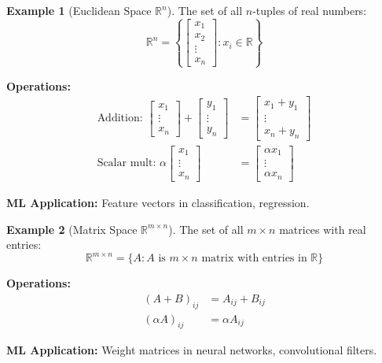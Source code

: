 \documentclass[12pt,a4paper]{article}
\theoremstyle{definition}
\newtheorem{example}{Example}[section]
\begin{document}
\begin{example}[Euclidean Space $\mathbb{R}^n$]
The set of all $n$-tuples of real numbers:
\begin{equation}
\mathbb{R}^n = \left\{ \begin{bmatrix} x_1 \\ x_2 \\ \vdots \\ x_n \end{bmatrix} : x_i \in \mathbb{R} \right\}
\end{equation}

\textbf{Operations:}
\begin{align}
\text{Addition: } \begin{bmatrix} x_1 \\ \vdots \\ x_n \end{bmatrix} + \begin{bmatrix} y_1 \\ \vdots \\ y_n \end{bmatrix} &= \begin{bmatrix} x_1 + y_1 \\ \vdots \\ x_n + y_n \end{bmatrix} \\
\text{Scalar mult: } \alpha \begin{bmatrix} x_1 \\ \vdots \\ x_n \end{bmatrix} &= \begin{bmatrix} \alpha x_1 \\ \vdots \\ \alpha x_n \end{bmatrix}
\end{align}

\textbf{ML Application:} Feature vectors in classification, regression.
\end{example}

\begin{example}[Matrix Space $\mathbb{R}^{m \times n}$]
The set of all $m \times n$ matrices with real entries:
\begin{equation}
\mathbb{R}^{m \times n} = \{ A : A \text{ is } m \times n \text{ matrix with entries in } \mathbb{R}\}
\end{equation}

\textbf{Operations:}
\begin{align}
(A + B)_{ij} &= A_{ij} + B_{ij} \\
(\alpha A)_{ij} &= \alpha A_{ij}
\end{align}

\textbf{ML Application:} Weight matrices in neural networks, convolutional filters.
\end{example}
\end{document}
